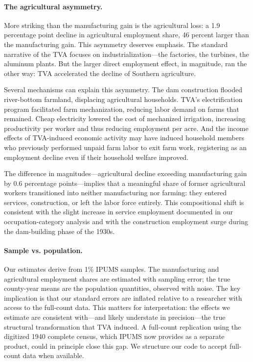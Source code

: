 \documentclass[12pt]{article}
\begin{document}
\paragraph{The agricultural asymmetry.} More striking than the manufacturing gain is the agricultural loss: a 1.9 percentage point decline in agricultural employment share, 46 percent larger than the manufacturing gain. This asymmetry deserves emphasis. The standard narrative of the TVA focuses on industrialization---the factories, the turbines, the aluminum plants. But the larger direct employment effect, in magnitude, ran the other way: TVA accelerated the decline of Southern agriculture.

Several mechanisms can explain this asymmetry. The dam construction flooded river-bottom farmland, displacing agricultural households. TVA's electrification program facilitated farm mechanization, reducing labor demand on farms that remained. Cheap electricity lowered the cost of mechanized irrigation, increasing productivity per worker and thus reducing employment per acre. And the income effects of TVA-induced economic activity may have induced household members who previously performed unpaid farm labor to exit farm work, registering as an employment decline even if their household welfare improved.

The difference in magnitudes---agricultural decline exceeding manufacturing gain by 0.6 percentage points---implies that a meaningful share of former agricultural workers transitioned into neither manufacturing nor farming: they entered services, construction, or left the labor force entirely. This compositional shift is consistent with the slight increase in service employment documented in our occupation-category analysis and with the construction employment surge during the dam-building phase of the 1930s.

\paragraph{Sample vs. population.} Our estimates derive from 1\% IPUMS samples. The manufacturing and agricultural employment shares are estimated with sampling error; the true county-year means are the population quantities, observed with noise. The key implication is that our standard errors are inflated relative to a researcher with access to the full-count data. This matters for interpretation: the effects we estimate are consistent with---and likely understate in precision---the true structural transformation that TVA induced. A full-count replication using the digitized 1940 complete census, which IPUMS now provides as a separate product, could in principle close this gap. We structure our code to accept full-count data when available.
\end{document}
